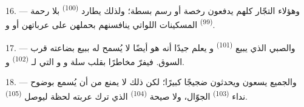 16. --- وهؤلاء التجّار كلهم يدفعون رخصة أو رسم بسطة؛ ولذلك يطارد
 \textsuperscript{(100)} بلا رحمة 
\textsuperscript{(99)} المسكينات اللواتي ينافسنهم بحملهن على عرباتهن
 أو  و.

\VUsaut{4.0mm}
\VUsaut{3.0mm}

17. --- والصبي الذي يبيع  \textsuperscript{(101)} و
يعلم جيدًا أنه هو أيضًا لا يُسمح له ببيع بضاعته قرب السوق. فيفرّ مخاطرًا
بقلب سلة  و
و التي لـ \textsuperscript{(102)}
 و.

18. --- والجميع يسعون ويحدثون ضجيجًا كبيرًا؛ لكن ذلك لا يمنع من أن يُسمع
بوضوح نداء  \textsuperscript{(103)} الجوّال، ولا صيحة
 \textsuperscript{(104)} الذي ترك عربته لحظة ليوصل  \textsuperscript{(105)}.
\VUsaut{6.0mm}
\VUfilet{22mm}
